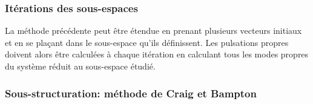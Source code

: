 \medskip
\subsubsection{Itérations des sous-espaces}
La méthode précédente peut être étendue en prenant plusieurs vecteurs initiaux et en se plaçant dans
le sous-espace qu'ils définissent. Les pulsations propres doivent alors être calculées à chaque itération 
en calculant tous les modes propres du système réduit au sous-espace étudié.

\medskip
\subsubsection{Sous-structuration: méthode de Craig et Bampton}

